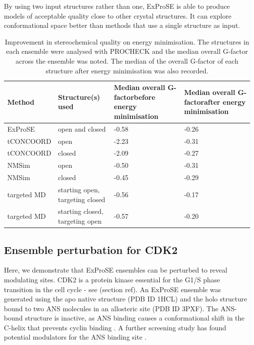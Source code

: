 By using two input structures rather than one, ExProSE is able to produce models of acceptable quality close to other crystal structures.
It can explore conformational space better than methods that use a single structure as input.


\begin{table}
\centering

\begin{footnotesize}
\begin{tabular}{ l l p{3cm} p{3cm} }
\hline
\textbf{Method} & \textbf{Structure(s) used} & \textbf{Median overall G-factor\newline before energy minimisation} & \textbf{Median overall G-factor\newline after energy minimisation} \\
\hline
ExProSE     & open and closed                 & -0.58 & -0.26 \\
tCONCOORD   & open                            & -2.23 & -0.31 \\
tCONCOORD   & closed                          & -2.09 & -0.27 \\
NMSim       & open                            & -0.50 & -0.31 \\
NMSim       & closed                          & -0.45 & -0.29 \\
targeted MD & starting open, targeting closed & -0.56 & -0.17 \\
targeted MD & starting closed, targeting open & -0.57 & -0.20 \\
\hline
\end{tabular}
\end{footnotesize}

\caption[Improvement in stereochemical quality of generated structures on energy minimisation]
{Improvement in stereochemical quality on energy minimisation.
The structures in each ensemble were analysed with PROCHECK and the median overall G-factor across the ensemble was noted.
The median of the overall G-factor of each structure after energy minimisation was also recorded.}

\label{tab:energy_minimisation}
\end{table}


\subsection{Ensemble perturbation for CDK2}

Here, we demonstrate that ExProSE ensembles can be perturbed to reveal modulating sites.
CDK2 is a protein kinase essential for the G1/S phase transition in the cell cycle - see (section ref).
An ExProSE ensemble was generated using the apo native structure (PDB ID 1HCL) and the holo structure bound to two ANS molecules in an allosteric site (PDB ID 3PXF).
The ANS-bound structure is inactive, as ANS binding causes a conformational shift in the C-helix that prevents cyclin binding \cite{Betzi2011}.
A further screening study has found potential modulators for the ANS binding site \cite{Rastelli2014}.

